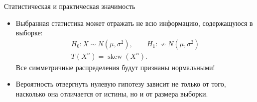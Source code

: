 \documentclass[11pt,pdf,utf8,hyperref={unicode},aspectratio=169]{beamer}
\DeclareMathOperator{\Skew}{skew}
\begin{document}
\begin{frame}{Статистическая и практическая значимость}{}
%
%
    \begin{itemize}
	   \item Выбранная статистика может отражать не всю информацию, содержащуюся в выборке:
        \begin{gather*}
            H_0\colon X\sim N\left(\mu, \sigma^2\right), \qquad
            H_1\colon \not\sim N\left(\mu, \sigma^2\right)
            \\
            T\left(X^n\right)= \Skew(X^n).
        \end{gather*}
Все симметричные распределения будут признаны нормальными!
		\item Вероятность отвергнуть нулевую гипотезу зависит не только от того, насколько она отличается от истины, но и от размера выборки.


\end{itemize}
\end{frame}
\end{document}
